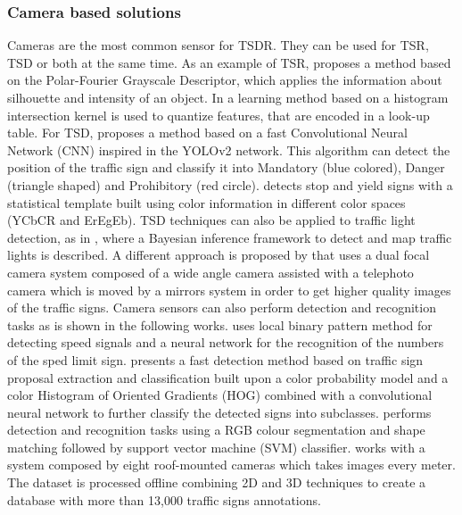 \subsubsection{Camera based solutions}
Cameras are the most common sensor for TSDR. They can be used for TSR, TSD or both at the same time.
As an example of TSR, \cite{frejlichowski2015application} proposes a method 
based on the Polar-Fourier Grayscale Descriptor, which applies the information 
about silhouette and intensity of an object. In \cite{gao2015learning} a 
learning method based on a histogram intersection kernel is used to quantize 
features, that are encoded in a look-up table.
For TSD, \cite{zhang2017real} proposes a method based on a fast Convolutional 
Neural Network (CNN) inspired in the YOLOv2 network. This algorithm 
can detect the position of the traffic sign and classify it into Mandatory 
(blue colored), Danger (triangle shaped) and Prohibitory (red circle). 
\cite{villalon2017traffic} detects stop and yield signs with a statistical 
template built using color information in different color spaces (YCbCR and 
ErEgEb). TSD techniques can also be applied to traffic light detection, as in 
\cite{hosseinyalamdary2017bayesian}, where a Bayesian inference framework to 
detect and map traffic lights is described. A different approach is proposed by 
\cite{gu2011traffic} that uses a dual focal camera system composed of a wide 
angle camera assisted with a telephoto camera which is moved by a mirrors 
system in order to get higher quality images of the traffic signs.
Camera sensors can also perform detection and recognition tasks as is 
shown in the following works. \cite{miyata2017automatic} uses local binary 
pattern method for detecting speed signals and a neural network for the 
recognition of the numbers of the sped limit sign. \cite{yang2016towards} 
presents a fast detection method based on traffic sign proposal extraction and 
classification built upon a color probability model and a color Histogram of
Oriented Gradients (HOG) combined with a convolutional neural network to
further classify the detected signs into subclasses.
\cite{wali2015automatic} performs detection and recognition tasks using a RGB 
colour segmentation and shape matching followed by support vector machine (SVM) 
classifier. \cite{timofte2014multi} works with a system composed by eight 
roof-mounted cameras which takes images every meter. The dataset is processed 
offline combining 2D and 3D techniques to create a database with more than 
13,000 traffic signs annotations.

